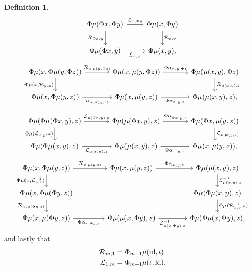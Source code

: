 \documentclass[openany, amssymb, psamsfonts]{amsart}
\theoremstyle{definition}
\newtheorem{defn}{Definition}[section]
\numberwithin{equation}{section}
\begin{document}
\begin{defn}
\begin{equation} \label{dgm:ambidexterity}
    \begin{tikzcd}[row sep = 2em]
        \Phi\mu(\Phi x, \Phi y) \ar[r, "\calL_{x, \Phi y}"] \ar[d, "\calR_{\Phi x, y}"'] & \Phi\mu(x, \Phi y) \ar[d, "\calR_{x, y}"]\\
        \Phi\mu(\Phi x, y) \ar[r, "\calL_{x, y}"'] & \Phi\mu(x, y),
    \end{tikzcd}
\end{equation}
\begin{equation} \label{dgm:right_assoc}
    \begin{tikzcd}[column sep = 3.5em]
        \Phi \mu(x, \Phi\mu(y, \Phi z)) \ar[r, "\calR_{x, \mu(y, \Phi z)}"] \ar[d, "{\Phi \mu(x, \calR_{y, z})}"'] & \Phi \mu(x, \mu(y, \Phi z)) \ar[r, "{\Phi \alpha_{x, y, \Phi z}}"] & \Phi \mu(\mu(x, y), \Phi z) \ar[d, "{\calR_{\mu(x, y), z}}"]\\
        \Phi \mu(x, \Phi \mu(y, z)) \ar[r, "{\calR_{x, \mu(y, z)}}"'] & \Phi \mu (x, \mu(y, z)) \ar[r, "{\Phi \alpha_{x, y, z}}"'] & \Phi \mu(\mu(x, y), z),
    \end{tikzcd}
\end{equation}
\begin{equation} \label{dgm:left_assoc}
    \begin{tikzcd}[column sep = 3.5em]
        \Phi\mu(\Phi \mu(\Phi x, y), z) \ar[r, "{\calL_{\mu(\Phi x, y), z}}"] \ar[d, "{\Phi \mu(\calL_{x, y}, z)}"'] & \Phi \mu(\mu(\Phi x, y), z) \ar[r, "{\Phi \alpha^{-1}_{\Phi x, y, z}}"] & \Phi \mu(\Phi x, \mu(y, z)) \ar[d, "{\calL_{x, \mu(y, z)}}"]\\
        \Phi\mu(\Phi \mu(x, y), z) \ar[r, "{\calL_{\mu(x, y), z}}"'] & \Phi \mu(\mu(x, y), z) \ar[r, "{\Phi\alpha_{x, y, z}}"'] & \Phi \mu(x, \mu(y, z)),
    \end{tikzcd}
\end{equation}
\begin{equation} \label{dgm:equilibrium}
    \begin{tikzcd}[column sep = 4em]
            \Phi \mu (x, \Phi \mu(y, z)) \ar[r, "{\calR_{x, \mu(y, z)}}"] \ar[d, "{\Phi \mu (x, \calL^{-1}_{y, z})}"'] & \Phi \mu(x, \mu(y, z)) \ar[r, "{\Phi \alpha_{x, y, z}}"] & \Phi \mu(\mu(x, y), z) \ar[d, "{\calL^{-1}_{\mu(x, y), z}}"]\\ 
            \Phi\mu(x, \Phi \mu(\Phi y, z)) \ar[d, "{\calR_{x, \mu(\Phi y, z)}}"'] && \Phi \mu(\Phi \mu(x, y), z) \ar[d, "{\Phi \mu(\calR^{-1}_{x, y}, z)}"]\\  
            \Phi \mu(x, \mu(\Phi y, z)) \ar[r, "{\Phi \alpha_{x, \Phi y, z}}"'] & \Phi \mu(\mu(x, \Phi y), z) \ar[r, "{\calL^{-1}_{\mu(x, \Phi y), z}}"'] & \Phi \mu(\Phi \mu(x, \Phi y), z),
    \end{tikzcd}
\end{equation} and lastly that
\begin{align}
    \mathcal{R}_{m, 1} &= \Phi_{m + 1}\mu(\mathrm{id}, \iota) \label{eq:right_unity}\\
    \mathcal{L}_{1, m} &= \Phi_{m + 1}\mu(\iota, \mathrm{id}). \label{eq:left_unity}
\end{align}


\end{defn}
\end{document}
